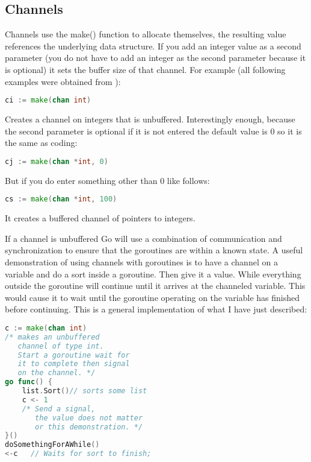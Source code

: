 \subsection{Channels}
Channels use the make() function to allocate themselves, the resulting value references the underlying data structure. If you add an integer value as a second parameter (you do not have to add an integer as the second parameter because it is optional) it sets the buffer size of that channel. For example (all following examples were obtained from \cite{website:go-lang-documentation}): 
\begin{lstlisting}[language=Go]
ci := make(chan int)
\end{lstlisting}

Creates a channel on integers that is unbuffered. Interestingly enough, because the second parameter is optional if it is not entered the default value is 0 so it is the same as coding:
\begin{lstlisting}[language=Go]
cj := make(chan *int, 0)
\end{lstlisting}
But if you do enter something other than 0 like follows:
\begin{lstlisting}[language=Go]
cs := make(chan *int, 100) 
\end{lstlisting}
It creates a buffered channel of pointers to integers. 

If a channel is unbuffered Go will use a combination of communication and synchronization to ensure that the goroutines are within a known state.  A useful demonstration of using channels with goroutines is to have a channel on a variable and do a sort inside a goroutine. Then give it a value. While everything outside the goroutine will continue until it arrives at the channeled variable. This would cause it to wait until the goroutine operating on the variable has finished before continuing.  This is a general implementation of what I have just described:
\begin{lstlisting}[language=Go]
c := make(chan int)  
/* makes an unbuffered 
   channel of type int.
   Start a goroutine wait for
   it to complete then signal 
   on the channel. */
go func() {
    list.Sort()// sorts some list 
    c <- 1  
    /* Send a signal, 
       the value does not matter 
       or this demonstration. */
}()
doSomethingForAWhile()
<-c   // Waits for sort to finish; 
\end{lstlisting}

